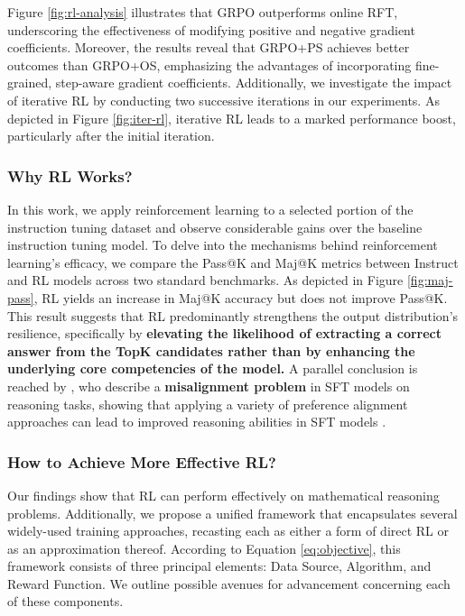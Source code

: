 \begin{itemize}[topsep=0pt]
Figure \ref{fig:rl-analysis} illustrates that GRPO outperforms online RFT, underscoring the effectiveness of modifying positive and negative gradient coefficients. Moreover, the results reveal that GRPO+PS achieves better outcomes than GRPO+OS, emphasizing the advantages of incorporating fine-grained, step-aware gradient coefficients. Additionally, we investigate the impact of iterative RL by conducting two successive iterations in our experiments. As depicted in Figure \ref{fig:iter-rl}, iterative RL leads to a marked performance boost, particularly after the initial iteration.

\subsubsection{Why RL Works?} In this work, we apply reinforcement learning to a selected portion of the instruction tuning dataset and observe considerable gains over the baseline instruction tuning model. To delve into the mechanisms behind reinforcement learning's efficacy, we compare the Pass@K and Maj@K metrics between Instruct and RL models across two standard benchmarks. As depicted in Figure \ref{fig:maj-pass}, RL yields an increase in Maj@K accuracy but does not improve Pass@K. This result suggests that RL predominantly strengthens the output distribution's resilience, specifically by \textbf{elevating the likelihood of extracting a correct answer from the TopK candidates rather than by enhancing the underlying core competencies of the model.} A parallel conclusion is reached by \citep{wang2023making}, who describe a \textbf{misalignment problem} in SFT models on reasoning tasks, showing that applying a variety of preference alignment approaches can lead to improved reasoning abilities in SFT models \citep{yuan2023rrhf,song2023preference,wang2023making}.

\subsubsection{How to Achieve More Effective RL?}
\label{sec:effec_rl}
Our findings show that RL can perform effectively on mathematical reasoning problems. Additionally, we propose a unified framework that encapsulates several widely-used training approaches, recasting each as either a form of direct RL or as an approximation thereof. According to Equation \ref{eq:objective}, this framework consists of three principal elements: Data Source, Algorithm, and Reward Function. We outline possible avenues for advancement concerning each of these components.


\end{itemize}
